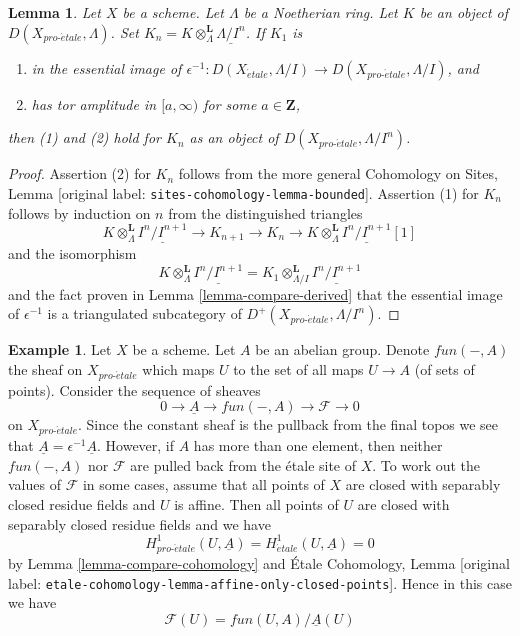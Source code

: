 \documentclass[10pt,a4paper]{article}
\theoremstyle{plain}
\newtheorem{lemma}[subsection]{Lemma}
\theoremstyle{definition}
\newtheorem{example}[subsection]{Example}
\theoremstyle{remark}
\numberwithin{equation}{subsection}
\def\proetale{{pro\text{-}\acute{e}tale}}
\def\etale{{\acute{e}tale}}
\begin{document}
\begin{lemma}
\label{lemma-compare-truncations}
Let $X$ be a scheme. Let $\Lambda$ be a Noetherian ring.
Let $K$ be an object of $D(X_\proetale, \Lambda)$.
Set $K_n = K \otimes_\Lambda^\mathbf{L} \underline{\Lambda/I^n}$.
If $K_1$ is
\begin{enumerate}
\item in the essential image of
$\epsilon^{-1} :D(X_\etale, \Lambda/I) \to D(X_\proetale, \Lambda/I)$, and
\item has tor amplitude in $[a,\infty)$ for some $a \in \mathbf{Z}$,
\end{enumerate}
then (1) and (2) hold for $K_n$ as an object of $D(X_\proetale, \Lambda/I^n)$.
\end{lemma}

\begin{proof}
Assertion (2) for $K_n$ follows from the more general
Cohomology on Sites, Lemma \textnormal{[original label: \nolinkurl{sites-cohomology-lemma-bounded}]}.
Assertion (1) for $K_n$ follows by induction on $n$ from the
distinguished triangles
$$
K \otimes_\Lambda^\mathbf{L} \underline{I^n/I^{n + 1}} \to
K_{n + 1} \to
K_n \to
K \otimes_\Lambda^\mathbf{L} \underline{I^n/I^{n + 1}}[1]
$$
and the isomorphism
$$
K \otimes_\Lambda^\mathbf{L} \underline{I^n/I^{n + 1}} =
K_1 \otimes_{\Lambda/I}^\mathbf{L} \underline{I^n/I^{n + 1}}
$$
and the fact proven in Lemma \ref{lemma-compare-derived}
that the essential image of $\epsilon^{-1}$ is a triangulated
subcategory of $D^+(X_\proetale, \Lambda/I^n)$.
\end{proof}

\begin{example}
\label{example-functions-mod-locally-constant-functions}
Let $X$ be a scheme. Let $A$ be an abelian group. Denote
$fun(-, A)$ the sheaf on $X_\proetale$ which maps $U$
to the set of all maps $U \to A$ (of sets of points).
Consider the sequence of sheaves
$$
0 \to \underline{A} \to fun(-, A) \to \mathcal{F} \to 0
$$
on $X_\proetale$. Since the constant sheaf is the pullback from the final
topos we see that $\underline{A} = \epsilon^{-1}\underline{A}$.
However, if $A$ has more than one element, then neither $fun(-, A)$
nor $\mathcal{F}$ are pulled back from the \'etale site of $X$.
To work out the values of $\mathcal{F}$ in some cases, assume that
all points of $X$ are closed with separably closed residue fields
and $U$ is affine. Then all points of $U$ are closed with separably
closed residue fields and we have
$$
H^1_\proetale(U, \underline{A}) =
H^1_\etale(U, \underline{A}) = 0
$$
by Lemma \ref{lemma-compare-cohomology} and
\'Etale Cohomology, Lemma
\textnormal{[original label: \nolinkurl{etale-cohomology-lemma-affine-only-closed-points}]}.
Hence in this case we have
$$
\mathcal{F}(U) = fun(U, A)/\underline{A}(U)
$$
\end{example}
\end{document}
